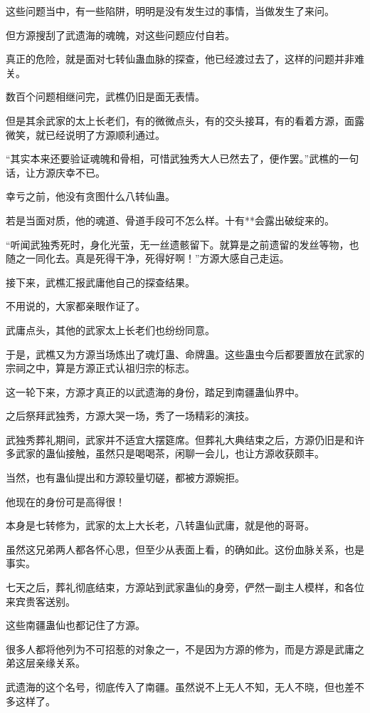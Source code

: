 \begin{this_body}
这些问题当中，有一些陷阱，明明是没有发生过的事情，当做发生了来问。

但方源搜刮了武遗海的魂魄，对这些问题应付自若。

真正的危险，就是面对七转仙蛊血脉的探查，他已经渡过去了，这样的问题并非难关。

数百个问题相继问完，武樵仍旧是面无表情。

但是其余武家的太上长老们，有的微微点头，有的交头接耳，有的看着方源，面露微笑，就已经说明了方源顺利通过。

“其实本来还要验证魂魄和骨相，可惜武独秀大人已然去了，便作罢。”武樵的一句话，让方源庆幸不已。

幸亏之前，他没有贪图什么八转仙蛊。

若是当面对质，他的魂道、骨道手段可不怎么样。十有**会露出破绽来的。

“听闻武独秀死时，身化光萤，无一丝遗骸留下。就算是之前遗留的发丝等物，也随之一同化去。真是死得干净，死得好啊！”方源大感自己走运。

接下来，武樵汇报武庸他自己的探查结果。

不用说的，大家都亲眼作证了。

武庸点头，其他的武家太上长老们也纷纷同意。

于是，武樵又为方源当场炼出了魂灯蛊、命牌蛊。这些蛊虫今后都要置放在武家的宗祠之中，算是方源正式认祖归宗的标志。

这一轮下来，方源才真正的以武遗海的身份，踏足到南疆蛊仙界中。

之后祭拜武独秀，方源大哭一场，秀了一场精彩的演技。

武独秀葬礼期间，武家并不适宜大摆筵席。但葬礼大典结束之后，方源仍旧是和许多武家的蛊仙接触，虽然只是喝喝茶，闲聊一会儿，也让方源收获颇丰。

当然，也有蛊仙提出和方源较量切磋，都被方源婉拒。

他现在的身份可是高得很！

本身是七转修为，武家的太上大长老，八转蛊仙武庸，就是他的哥哥。

虽然这兄弟两人都各怀心思，但至少从表面上看，的确如此。这份血脉关系，也是事实。

七天之后，葬礼彻底结束，方源站到武家蛊仙的身旁，俨然一副主人模样，和各位来宾贵客送别。

这些南疆蛊仙也都记住了方源。

很多人都将他列为不可招惹的对象之一，不是因为方源的修为，而是方源是武庸之弟这层亲缘关系。

武遗海的这个名号，彻底传入了南疆。虽然说不上无人不知，无人不晓，但也差不多这样了。


\end{this_body}

